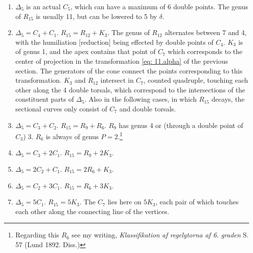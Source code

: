 \documentclass[leqno]{article}
\begin{document}
\begin{enumerate}[label=\arabic*)]
	\item $\Delta_5$ is an actual $C_5$, which can have a maximum of 6 double points. The genus of $R_{15}$ is usually 11, but can be lowered to 5 by $\delta$.
	\item $\Delta_5 = C_4 + C_1$. $R_{15} = R_{12} + K_3$. The genus of $R_{12}$ alternates between 7 and 4, with the humiliation [reduction] being effected by  double points of $C_4$. $K_3$ is of genus 1, and the apex contains that point of $C_7$ which corresponds to the center of projection in the transformation \eqref{eq: 11.alpha} of the previous section. The generators of the cone connect the points corresponding to this transformation. $K_3$ and $R_{12}$ intersect in $C_7$, counted quadruple, touching each other along the 4 double torsals, which correspond to the intersections of the constituent parts of $\Delta_5$. Also in the following cases, in which $R_{15}$ decays, the sectional curves only consist of $C_7$ and double torsals.
	\item $\Delta_5 = C_3 + C_2$. $R_{15} = R_9 + R_6$. $R_9$ has genus 4 or (through a double point of $C_3$) 3. $R_6$ is always of genus $P=2$.\footnote{Regarding this $R_6$ see my writing, \textit{Klassifikation af regelytorna af 6. graden} S. 57 (Lund 1892. Diss.)} 
	\item $\Delta_5 = C_3 + 2 C_1$. $R_{15} = R_9 + 2 K_3$. 
	\item $\Delta_5 = 2 C_2 + C_1$. $R_{15} = 2 R_6 + K_3$.
	\item $\Delta_5 = C_2 + 3 C_1$. $R_{15} = R_6 + 3 K_3$.
	\item $\Delta_5 = 5 C_1$. $R_{15} = 5 K_3$. The $C_7$ lies here on $5K_3$, each pair of which touches each other along the connecting line of the vertices.
\end{enumerate}
\end{document}
